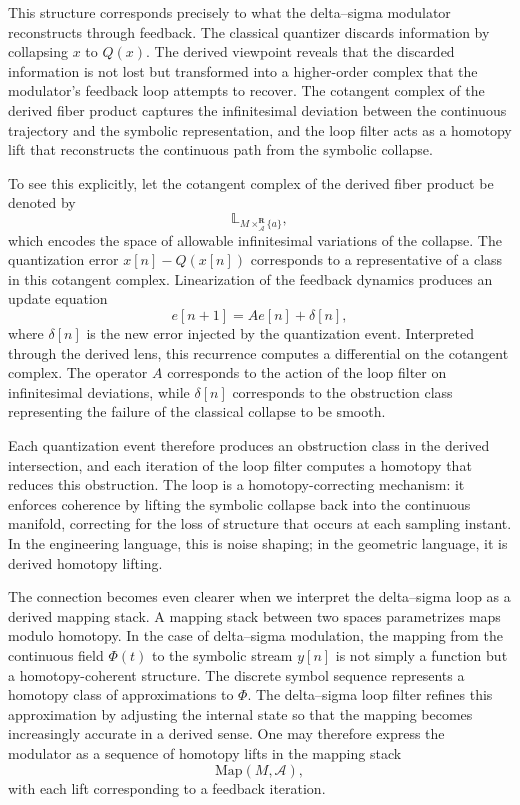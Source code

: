 This structure corresponds precisely to what the delta–sigma modulator reconstructs through feedback. The classical quantizer discards information by collapsing \(x\) to \(Q(x)\). The derived viewpoint reveals that the discarded information is not lost but transformed into a higher-order complex that the modulator’s feedback loop attempts to recover. The cotangent complex of the derived fiber product captures the infinitesimal deviation between the continuous trajectory and the symbolic representation, and the loop filter acts as a homotopy lift that reconstructs the continuous path from the symbolic collapse.

To see this explicitly, let the cotangent complex of the derived fiber product be denoted by
\[
\mathbb{L}_{M \times^{\mathbf{R}}_{\mathcal{A}} \{a\}},
\]
which encodes the space of allowable infinitesimal variations of the collapse. The quantization error \(x[n] - Q(x[n])\) corresponds to a representative of a class in this cotangent complex. Linearization of the feedback dynamics produces an update equation
\[
e[n+1] = A e[n] + \delta[n],
\]
where \(\delta[n]\) is the new error injected by the quantization event. Interpreted through the derived lens, this recurrence computes a differential on the cotangent complex. The operator \(A\) corresponds to the action of the loop filter on infinitesimal deviations, while \(\delta[n]\) corresponds to the obstruction class representing the failure of the classical collapse to be smooth.

Each quantization event therefore produces an obstruction class in the derived intersection, and each iteration of the loop filter computes a homotopy that reduces this obstruction. The loop is a homotopy-correcting mechanism: it enforces coherence by lifting the symbolic collapse back into the continuous manifold, correcting for the loss of structure that occurs at each sampling instant. In the engineering language, this is noise shaping; in the geometric language, it is derived homotopy lifting.

The connection becomes even clearer when we interpret the delta–sigma loop as a derived mapping stack. A mapping stack between two spaces parametrizes maps modulo homotopy. In the case of delta–sigma modulation, the mapping from the continuous field \(\Phi(t)\) to the symbolic stream \(y[n]\) is not simply a function but a homotopy-coherent structure. The discrete symbol sequence represents a homotopy class of approximations to \(\Phi\). The delta–sigma loop filter refines this approximation by adjusting the internal state so that the mapping becomes increasingly accurate in a derived sense. One may therefore express the modulator as a sequence of homotopy lifts in the mapping stack
\[
\mathrm{Map}(M, \mathcal{A}),
\]
with each lift corresponding to a feedback iteration.

